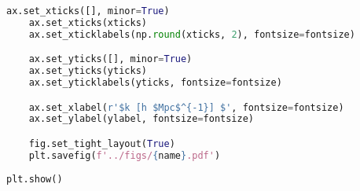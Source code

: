 \begin{lstlisting}[language=python]
    ax.set_xticks([], minor=True)
    ax.set_xticks(xticks)
    ax.set_xticklabels(np.round(xticks, 2), fontsize=fontsize)

    ax.set_yticks([], minor=True)
    ax.set_yticks(yticks)
    ax.set_yticklabels(yticks, fontsize=fontsize)

    ax.set_xlabel(r'$k [h $Mpc$^{-1}] $', fontsize=fontsize) 
    ax.set_ylabel(ylabel, fontsize=fontsize)

    fig.set_tight_layout(True)
    plt.savefig(f'../figs/{name}.pdf')
   
plt.show()



\end{lstlisting}
\renewcommand{\baselinestretch}{1.5}



